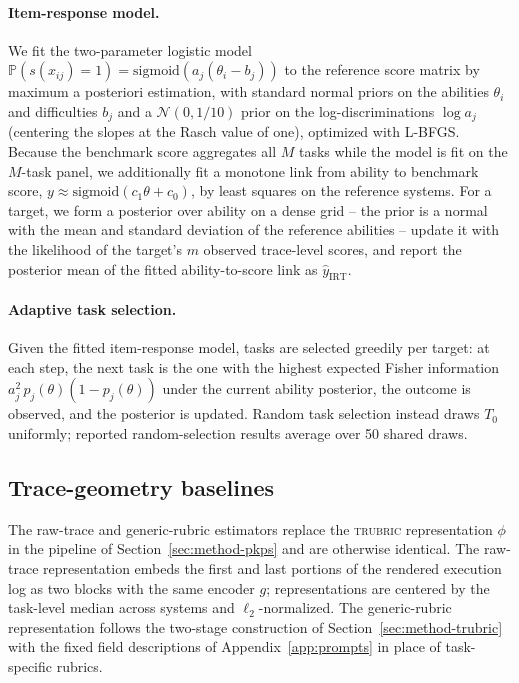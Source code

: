\documentclass{article}
\newcommand{\trubric}{\textsc{trubric}}
\begin{document}
\paragraph{Item-response model.}
We fit the two-parameter logistic model $\mathbb{P}(s(x_{ij}) = 1) = \mathrm{sigmoid}\left(a_{j} (\theta_{i} - b_{j})\right)$ to the reference score matrix by maximum a posteriori estimation, with standard normal priors on the abilities $\theta_{i}$ and difficulties $b_{j}$ and a $\mathcal{N}(0, 1/10)$ prior on the log-discriminations $\log a_{j}$ (centering the slopes at the Rasch value of one), optimized with L-BFGS.
Because the benchmark score aggregates all $M$ tasks while the model is fit on the $M$-task panel, we additionally fit a monotone link from ability to benchmark score, $y \approx \mathrm{sigmoid}(c_{1} \theta + c_{0})$, by least squares on the reference systems.
For a target, we form a posterior over ability on a dense grid -- the prior is a normal with the mean and standard deviation of the reference abilities -- update it with the likelihood of the target's $m$ observed trace-level scores, and report the posterior mean of the fitted ability-to-score link as $\hat{y}_{\mathrm{IRT}}$.

\paragraph{Adaptive task selection.}
Given the fitted item-response model, tasks are selected greedily per target: at each step, the next task is the one with the highest expected Fisher information $a_{j}^{2} \, p_{j}(\theta)(1 - p_{j}(\theta))$ under the current ability posterior, the outcome is observed, and the posterior is updated.
Random task selection instead draws $T_{0}$ uniformly; reported random-selection results average over 50 shared draws.

\subsection{Trace-geometry baselines}
\label{app:geom-baselines}

The raw-trace and generic-rubric estimators replace the \trubric{} representation $\phi$ in the pipeline of Section~\ref{sec:method-pkps} and are otherwise identical.
The raw-trace representation embeds the first and last portions of the rendered execution log as two blocks with the same encoder $g$; representations are centered by the task-level median across systems and $\ell_{2}$-normalized.
The generic-rubric representation follows the two-stage construction of Section~\ref{sec:method-trubric} with the fixed field descriptions of Appendix~\ref{app:prompts} in place of task-specific rubrics.
\end{document}
